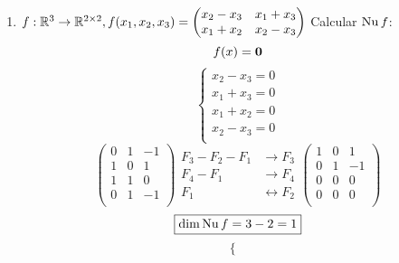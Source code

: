 \documentclass[../practica.root.tex]{subfiles}
\begin{document}
\begin{enumerate}
\begin{enumerate}
              \item \( f : \mathbb{R}^3 \to \mathbb{R}^{2\times2}, f(x_1, x_2, x_3) =
                    \begin{pmatrix}
                        x_2 - x_3 & x_1 + x_3 \\
                        x_1 + x_2 & x_2 - x_3
                    \end{pmatrix} \)
                    Calcular \(\operatorname{Nu} f\):
                    \[ f(x) = \mathbf{0} \]
                    \[
                        \begin{cases}
                            x_2 - x_3 = 0 \\
                            x_1 + x_3 = 0 \\
                            x_1 + x_2 = 0 \\
                            x_2 - x_3 = 0 \\
                        \end{cases}
                    \] \[
                        \begin{pmatrix}
                            0 & 1 & -1 \\
                            1 & 0 & 1  \\
                            1 & 1 & 0  \\
                            0 & 1 & -1 \\
                        \end{pmatrix}
                        \begin{array}{rl}
                            F_3 - F_2 - F_1 & \to F_3             \\
                            F_4 - F_1       & \to F_4             \\
                            F_1             & \leftrightarrow F_2
                        \end{array}
                        \begin{pmatrix}
                            1 & 0 & 1  \\
                            0 & 1 & -1 \\
                            0 & 0 & 0  \\
                            0 & 0 & 0  \\
                        \end{pmatrix}
                    \] \[
                        \boxed{\dim\operatorname{Nu} f = 3 - 2 = 1}
                    \] \[
                        \begin{cases}

\end{cases}\]
\end{enumerate}
\end{enumerate}
\end{document}

